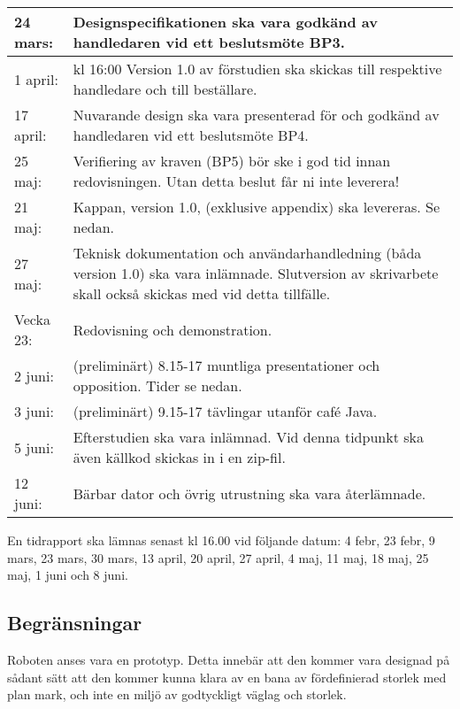 \documentclass[11pt]{article}
\begin{document}
\begin{flushleft}
\begin{center}
\begin{longtable}{|l |p{.8\linewidth}|}
24 mars: &
Designspecifikationen ska vara godkänd av handledaren vid ett beslutsmöte BP3. \\ \hline

1 april: &
kl 16:00 Version 1.0 av förstudien ska skickas till respektive handledare och till beställare. \\ \hline

17 april: & 
Nuvarande design ska vara presenterad för och godkänd av handledaren vid ett beslutsmöte BP4. \\ \hline

25 maj: &
Verifiering av kraven (BP5) bör ske i god tid innan redovisningen. Utan detta beslut får ni inte leverera! \\ \hline

21 maj: &
Kappan, version 1.0, (exklusive appendix) ska levereras. Se nedan. \\ \hline

27 maj: &
Teknisk dokumentation och användarhandledning (båda version 1.0) ska vara inlämnade. Slutversion av skrivarbete skall också skickas med vid detta tillfälle. \\ \hline

Vecka 23: &
Redovisning och demonstration.\\ \hline

2 juni: &
(preliminärt) 8.15-17 muntliga presentationer och opposition. Tider se nedan. \\ \hline

3 juni: &
(preliminärt) 9.15-17 tävlingar utanför café Java. \\ \hline

5 juni: &
Efterstudien ska vara inlämnad. Vid denna tidpunkt ska även källkod skickas in i en zip-fil. \\ \hline

12 juni: &
Bärbar dator och övrig utrustning ska vara återlämnade. \\ \hline
\end{longtable}
\end{center}

En tidrapport ska lämnas senast kl 16.00 vid följande datum: 4 febr, 23 febr, 9 mars, 23 mars, 30 mars, 13 april, 20 april, 27 april, 4 maj, 11 maj, 18 maj, 25 maj, 1 juni och 8 juni.

\subsection{Begränsningar} %
Roboten anses vara en prototyp. Detta innebär att den kommer vara designad på sådant sätt att den kommer kunna klara av en bana av fördefinierad storlek med plan mark, och inte en miljö av godtyckligt väglag och storlek. 


\end{flushleft}
\end{document}
